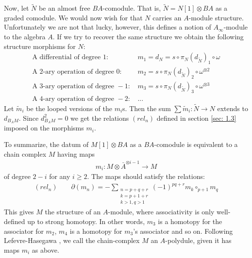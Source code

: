 \documentclass[../thesis.tex]{subfiles}
\begin{document}
            Now, let $\widetilde{N}$ be an almost free $BA$-comodule. That is, $\widetilde{N} = N[1] \otimes BA$ as a graded comodule. We would now wish for that $N$ carries an $A$-module structure. Unfortunately we are not that lucky, however, this defines a notion of $A_\infty$-module to the algebra $A$. If we try to recover the same structure we obtain the following structure morphisms for $N$:
            \begin{align*}
                \text{A differential of degree }1\text{: }& m_1 = d_{N} = s\circ \pi_N (d_{\widetilde{N}})_1 \circ \omega\\
                \text{A 2-ary operation of degree }0\text{: }& m_2 = s\circ \pi_N (d_{\widetilde{N}})_2 \circ \omega^{\otimes 2}\\
                \text{A 3-ary operation of degree }-1\text{: }& m_3 = s\circ \pi_N (d_{\widetilde{N}})_3 \circ \omega^{\otimes 3}\\
                \text{A 4-ary operation of degree }-2\text{: }& \text{...}
            \end{align*}
            Let $\widetilde{m}_i$ be the looped versions of the $m_i$s. Then the sum $\sum \widetilde{m}_i : \widetilde{N} \rightarrow N$ extends to $d_{B_AM}$. Since $d_{B_AM}^2 = 0$ we get the relations $(rel_n)$ defined in section \ref{sec: 1.3} imposed on the morphisms $m_i$. 

            To summarize, the datum of $M[1] \otimes BA$ as a  $BA$-comodule is equivalent to a chain complex $M$ having maps 
            \begin{align*}
                m_i : M \otimes \bar{A}^{\otimes i-1} \rightarrow M
            \end{align*}
            of degree $2-i$ for any $i \geq 2$. The maps should satisfy the relations:
            \begin{align*}
                (rel_n) \qquad \partial(m_n) = - \sum_{\substack{n = p + q + r \\ k = p + 1 + r \\ k > 1, q > 1}}(-1)^{pq+r}m_k\circ_{p+1}m_q  
            \end{align*}
            This gives $M$ the structure of an $A$-module, where associativity is only well-defined up to strong homotopy. In other words, $m_3$ is a homotopy for the associator for $m_2$, $m_4$ is a homotopy for $m_3$'s associator and so on. Following Lefevre-Hasegawa \cite{LefevreHasegawa03}, we call the chain-complex $M$ an $A$-polydule, given it has maps $m_i$ as above.
\end{document}
